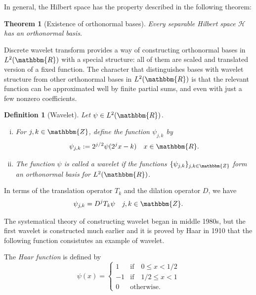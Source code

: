 \documentclass{book}
\newcommand{\assign}{:=}
\newcommand{\tmname}[1]{\textsc{#1}}
\newcommand{\tmsamp}[1]{\textsf{#1}}
\newcommand{\tmtextit}[1]{{\itshape{#1}}}
\newcommand{\tmverbatim}[1]{{\ttfamily{#1}}}
\newenvironment{enumerateroman}{\begin{enumerate}[i.] }{\end{enumerate}}
\newtheorem{definition}{Definition}
{\theorembodyfont{\rmfamily}\newtheorem{example}{Example}}
\newtheorem{theorem}{Theorem}
\begin{document}
In general, the Hilbert space has the property described in the following
theorem:{\cite{christensen2010functions}}

\begin{theorem}[Existence of orthonormal bases]
  Every separable Hilbert space
  {\tmname{{\tmsamp{\tmverbatim{}}}}}$\mathcal{H}$ has an orthonormal basis.
\end{theorem}

Discrete wavelet transform provides a way of constructing orthonormal bases in
$L^2 (\mathbbm{R})$ with a special structure: all of them are scaled and
translated version of a fixed function. The character that distinguishes bases
with wavelet structure from other orthonormal bases in $L^2 (\mathbbm{R})$ is
that the relevant function can be approximated well by finite partial sums,
and even with just a few nonzero coefficients.

\begin{definition}[Wavelet]
  Let $\psi \in L^2 (\mathbbm{R})$.
  \begin{enumerateroman}
    \item For $j, k \in \mathbbm{Z}$, define the function $\psi_{j, k}$ by
    \[ \psi_{j, k} \assign 2^{j / 2} \psi (2^j x - k) \quad x \in \mathbbm{R}.
    \]
    \item The function $\psi$ is called a wavelet if the functions $\{
    \psi_{j, k} \}_{j, k \in \mathbbm{Z}}$ form an orthonormal basis for $L^2
    (\mathbbm{R})$.
  \end{enumerateroman}
\end{definition}

In terms of the translation operator $T_k$ and the dilation operator $D$, we
have
\[ \psi_{j, k} = D^j T_k \psi \quad j, k \in \mathbbm{Z}. \]


The systematical theory of constructing wavelet began in middle 1980s, but the
first wavelet is constructed much earlier and it is proved by Haar in 1910
that the following function consistutes an example of wavelet.

\begin{example}
  The \tmtextit{Haar function} is defined by \[ \psi (x) = \left\{
     \begin{array}{cc}
       1 & \text{if} \quad 0 \leqslant x < 1 / 2\\
       - 1 & \text{if} \quad 1 / 2 \leqslant x < 1\\
       0 & \text{otherwise.}
     \end{array} \right. \]
\end{example}
\end{document}

